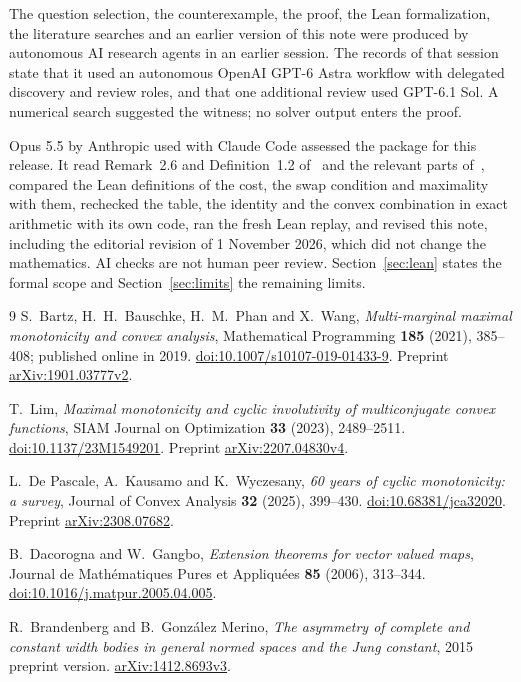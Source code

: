 \documentclass[11pt]{article}
\begin{document}
The question selection, the counterexample, the proof, the Lean
formalization, the literature searches and an earlier version of this
note were produced by autonomous AI research agents in an earlier
session. The records of that session state that it used an autonomous
OpenAI GPT-6 Astra workflow with delegated discovery and review roles,
and that one additional review used GPT-6.1 Sol. A numerical search
suggested the witness; no solver output enters the proof.

Opus 5.5 by Anthropic used with Claude Code assessed the package for this
release. It read Remark~2.6 and Definition~1.2 of~\cite{BBPW} and the
relevant parts of~\cite{Lim}, compared the Lean definitions of the cost,
the swap condition and maximality with them, rechecked the table, the
identity and the convex combination in exact arithmetic with its own
code, ran the fresh Lean replay, and revised this note, including the
editorial revision of 1 November 2026, which did not change the
mathematics. AI checks are not human peer review. Section~\ref{sec:lean}
states the formal scope and Section~\ref{sec:limits} the remaining limits.

\begin{thebibliography}{9}
S.~Bartz, H.~H.~Bauschke, H.~M.~Phan and X.~Wang,
\emph{Multi-marginal maximal monotonicity and convex analysis},
Mathematical Programming \textbf{185} (2021), 385--408;
published online in 2019.
\href{https://doi.org/10.1007/s10107-019-01433-9}{doi:10.1007/s10107-019-01433-9}.
Preprint \href{https://arxiv.org/abs/1901.03777v2}{arXiv:1901.03777v2}.

T.~Lim, \emph{Maximal monotonicity and cyclic involutivity of
multiconjugate convex functions}, SIAM Journal on Optimization
\textbf{33} (2023), 2489--2511.
\href{https://doi.org/10.1137/23M1549201}{doi:10.1137/23M1549201}.
Preprint \href{https://arxiv.org/abs/2207.04830v4}{arXiv:2207.04830v4}.

L.~De Pascale, A.~Kausamo and K.~Wyczesany,
\emph{60 years of cyclic monotonicity: a survey}, Journal of Convex
Analysis \textbf{32} (2025), 399--430.
\href{https://doi.org/10.68381/jca32020}{doi:10.68381/jca32020}.
Preprint \href{https://arxiv.org/abs/2308.07682}{arXiv:2308.07682}.

B.~Dacorogna and W.~Gangbo, \emph{Extension theorems for vector valued
maps}, Journal de Math\'ematiques Pures et Appliqu\'ees \textbf{85} (2006),
313--344.
\href{https://doi.org/10.1016/j.matpur.2005.04.005}{doi:10.1016/j.matpur.2005.04.005}.

R.~Brandenberg and B.~Gonz\'alez Merino,
\emph{The asymmetry of complete and constant width bodies in general
normed spaces and the Jung constant}, 2015 preprint version.
\href{https://arxiv.org/abs/1412.8693v3}{arXiv:1412.8693v3}.
\end{thebibliography}
\end{document}

